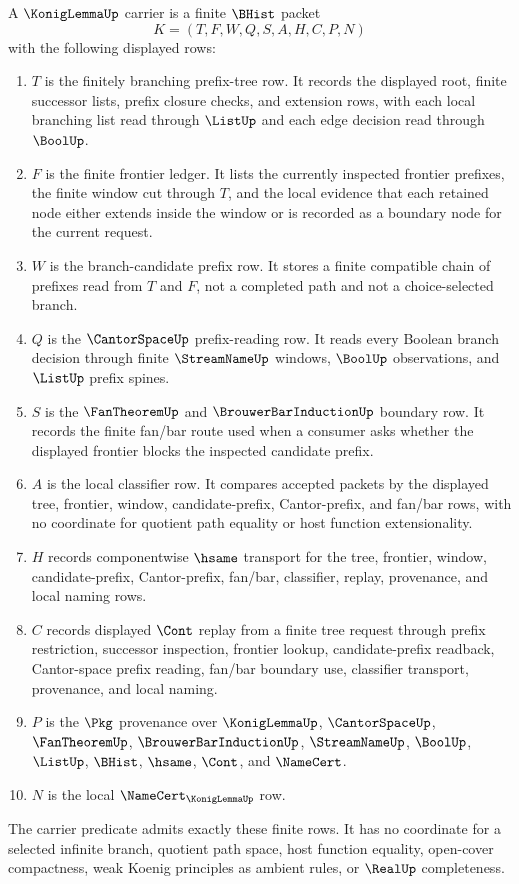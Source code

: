 \begin{definition}
\label{def:konig-lemma-carrier}
A $\KonigLemmaUp$ carrier is a finite $\BHist$ packet
$$
K=(T,F,W,Q,S,A,H,C,P,N)
$$
with the following displayed rows:
\begin{enumerate}
\item $T$ is the finitely branching prefix-tree row. It records the displayed root, finite successor lists, prefix closure checks, and extension rows, with each local branching list read through $\ListUp$ and each edge decision read through $\BoolUp$.
\item $F$ is the finite frontier ledger. It lists the currently inspected frontier prefixes, the finite window cut through $T$, and the local evidence that each retained node either extends inside the window or is recorded as a boundary node for the current request.
\item $W$ is the branch-candidate prefix row. It stores a finite compatible chain of prefixes read from $T$ and $F$, not a completed path and not a choice-selected branch.
\item $Q$ is the $\CantorSpaceUp$ prefix-reading row. It reads every Boolean branch decision through finite $\StreamNameUp$ windows, $\BoolUp$ observations, and $\ListUp$ prefix spines.
\item $S$ is the $\FanTheoremUp$ and $\BrouwerBarInductionUp$ boundary row. It records the finite fan/bar route used when a consumer asks whether the displayed frontier blocks the inspected candidate prefix.
\item $A$ is the local classifier row. It compares accepted packets by the displayed tree, frontier, window, candidate-prefix, Cantor-prefix, and fan/bar rows, with no coordinate for quotient path equality or host function extensionality.
\item $H$ records componentwise $\hsame$ transport for the tree, frontier, window, candidate-prefix, Cantor-prefix, fan/bar, classifier, replay, provenance, and local naming rows.
\item $C$ records displayed $\Cont$ replay from a finite tree request through prefix restriction, successor inspection, frontier lookup, candidate-prefix readback, Cantor-space prefix reading, fan/bar boundary use, classifier transport, provenance, and local naming.
\item $P$ is the $\Pkg$ provenance over $\KonigLemmaUp$, $\CantorSpaceUp$, $\FanTheoremUp$, $\BrouwerBarInductionUp$, $\StreamNameUp$, $\BoolUp$, $\ListUp$, $\BHist$, $\hsame$, $\Cont$, and $\NameCert$.
\item $N$ is the local $\NameCert_{\KonigLemmaUp}$ row.
\end{enumerate}
The carrier predicate admits exactly these finite rows. It has no coordinate for a selected infinite branch, quotient path space, host function equality, open-cover compactness, weak Koenig principles as ambient rules, or $\RealUp$ completeness.
\end{definition}

